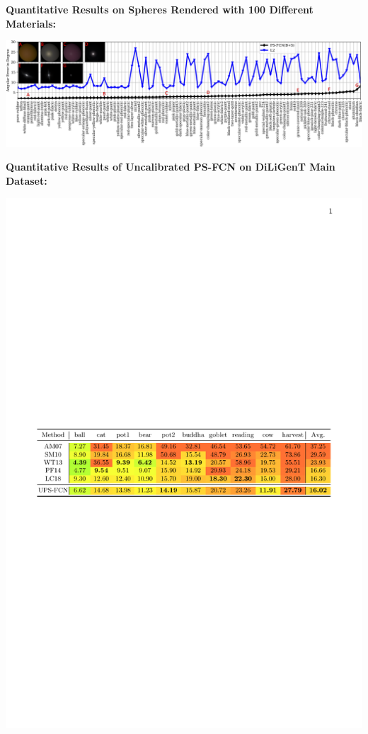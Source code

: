 {    \begin{minipage}[t]{0.6\textwidth}
        \textbf{\color{sufered}Quantitative Results on Spheres Rendered with 100 Different Materials:} 
        \vspace{-0.5em}
        \begin{center}
            \includegraphics[width=\textwidth]{images/100brdf.png}
        \end{center}
    \end{minipage}
    \begin{minipage}[t]{0.4\textwidth}
        \textbf{\color{sufered}Quantitative Results of Uncalibrated PS-FCN on DiLiGenT Main Dataset:} 
        \vspace{-0.5em}
        \begin{center}
            \includegraphics[width=\textwidth]{images/res_uncalibrated}
        \end{center}
        \vspace{-1.5em}


\end{minipage}}
